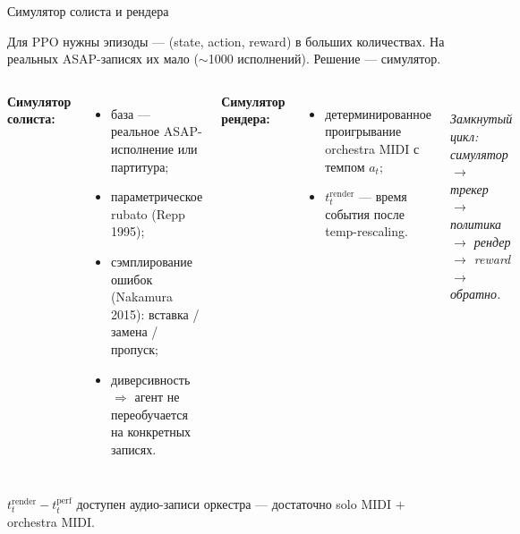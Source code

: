 ﻿%
\begin{frame}{Симулятор солиста и рендера}
  \footnotesize

  Для PPO нужны эпизоды --- (state, action, reward) в больших
  количествах. На реальных ASAP-записях их мало ($\sim$1000
  исполнений). Решение --- симулятор.

  \begin{columns}[T,onlytextwidth]
    \textbf{Симулятор солиста:}
    \begin{itemize}\setlength{\itemsep}{0.2em}
      \item база --- реальное ASAP-исполнение или партитура;
      \item параметрическое rubato (Repp 1995);
      \item сэмплирование ошибок (Nakamura 2015): вставка / замена /
            пропуск;
      \item диверсивность $\Rightarrow$ агент не переобучается на
            конкретных записях.
    \end{itemize}

    \vspace{0.4em}
    \textbf{Симулятор рендера:}
    \begin{itemize}\setlength{\itemsep}{0.2em}
      \item детерминированное проигрывание orchestra MIDI с темпом
            $a_t$;
      \item $t^{\text{render}}_t$ --- время события после temp-rescaling.
    \end{itemize}

    \centering
    \resizebox{\linewidth}{!}{%
    }\\[0.4em]
    {\scriptsize\itshape\color{black!70}
     Замкнутый цикл: симулятор $\to$ трекер $\to$\\
     политика $\to$ рендер $\to$ reward $\to$ обратно.}
  \end{columns}

  \vspace{0.3em}
  {\centering\footnotesize
   $t^{\text{render}}_t - t^{\text{perf}}_t$ доступен 
   аудио-записи оркестра --- достаточно solo MIDI $+$ orchestra MIDI.\par}
\end{frame}

